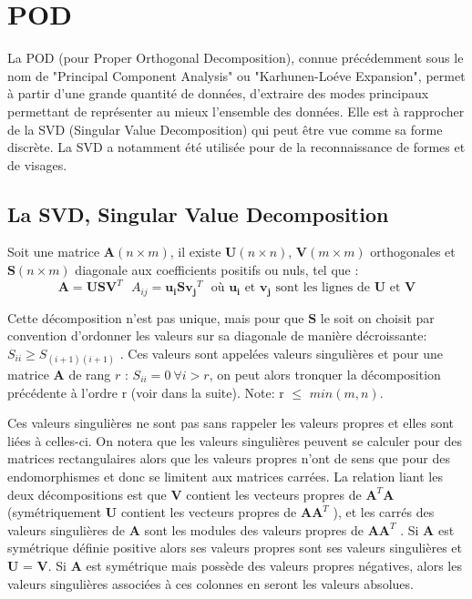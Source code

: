 \documentclass[12pt,a4paper]{report}
\begin{document}
\section{POD}
\label{IntroPOD}
La POD (pour Proper Orthogonal Decomposition), connue précédemment sous le nom de "Principal Component Analysis" ou "Karhunen-Loéve Expansion", permet à partir d'une grande quantité de données, d'extraire des modes principaux permettant de représenter au mieux l'ensemble des données. Elle est à rapprocher de la SVD (Singular Value Decomposition) qui peut être vue comme sa forme discrète. La SVD a notamment été utilisée pour de la reconnaissance de formes et de visages. 
\subsection{La SVD, Singular Value Decomposition}
Soit une matrice $\mathbf{A} (n \times m)$, il existe $\mathbf{U} (n \times n)$, $\mathbf{V} (m \times m)$ orthogonales et $\mathbf{S} (n \times m)$ diagonale aux coefficients positifs ou nuls, tel que :
\begin{equation}
\mathbf{A} = \mathbf{U}\mathbf{S}\mathbf{V}^T
~~~A_{ij} = \mathbf{u_i} \mathbf{S} \mathbf{v_j}^T
~~~\text{où }\mathbf{u_i}\text{ et }\mathbf{v_j}\text{ sont les lignes de }\mathbf{U}\text{ et }\mathbf{V}
\end{equation}

Cette décomposition n'est pas unique, mais pour que $\mathbf{S}$ le soit on choisit par convention d'ordonner les valeurs sur sa diagonale de manière décroissante: $S_{ii} \geq S_{(i+1)(i+1)}$ . Ces valeurs sont appelées valeurs singulières et pour une matrice $\mathbf{A}$ de rang $r$ : 
$S_{ii} = 0~ \forall i > r$, on peut alors tronquer la décomposition précédente à l'ordre r (voir dans la suite). Note: r $\leq$ $min(m, n)$.

Ces valeurs singulières ne sont pas sans rappeler les valeurs propres et elles sont liées à celles-ci. On notera que les valeurs singulières peuvent se calculer pour des matrices rectangulaires alors que les valeurs propres n'ont de sens que pour des endomorphismes et donc se limitent aux matrices carrées. La relation liant les deux décompositions est que $\mathbf{V}$ contient les vecteurs propres de $\mathbf{A}^T \mathbf{A}$ (symétriquement $\mathbf{U}$ contient les vecteurs propres de $\mathbf{A}\mathbf{A}^T$ ), et les carrés des valeurs singulières de $\mathbf{A}$ sont les modules des valeurs propres de $\mathbf{A}\mathbf{A}^T$ . Si $\mathbf{A}$ est symétrique définie positive alors ses valeurs propres sont ses valeurs singulières et $\mathbf{U}$ = $\mathbf{V}$. Si $\mathbf{A}$ est symétrique mais possède des valeurs propres négatives, alors les valeurs singulières associées à ces colonnes en seront les valeurs absolues. 
\end{document}
